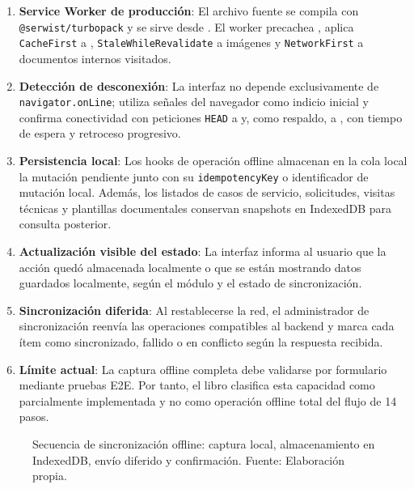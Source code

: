 \begin{enumerate}
    \item \textbf{Service Worker de producción}: El archivo fuente  se compila con \texttt{@serwist/turbopack} y se sirve desde . El worker precachea , aplica \texttt{CacheFirst} a , \texttt{StaleWhileRevalidate} a imágenes y \texttt{NetworkFirst} a documentos internos visitados.
    \item \textbf{Detección de desconexión}: La interfaz no depende exclusivamente de \texttt{navigator.onLine}; utiliza señales del navegador como indicio inicial y confirma conectividad con peticiones \texttt{HEAD} a  y, como respaldo, a , con tiempo de espera y retroceso progresivo.
    \item \textbf{Persistencia local}: Los hooks de operación offline almacenan en la cola local la mutación pendiente junto con su \texttt{idempotencyKey} o identificador de mutación local. Además, los listados de casos de servicio, solicitudes, visitas técnicas y plantillas documentales conservan snapshots en IndexedDB para consulta posterior.
    \item \textbf{Actualización visible del estado}: La interfaz informa al usuario que la acción quedó almacenada localmente o que se están mostrando datos guardados localmente, según el módulo y el estado de sincronización.
    \item \textbf{Sincronización diferida}: Al restablecerse la red, el administrador de sincronización reenvía las operaciones compatibles al backend y marca cada ítem como sincronizado, fallido o en conflicto según la respuesta recibida.
    \item \textbf{Límite actual}: La captura offline completa debe validarse por formulario mediante pruebas E2E. Por tanto, el libro clasifica esta capacidad como parcialmente implementada y no como operación offline total del flujo de 14 pasos.
\end{enumerate}

\begin{figure}[!htbp]
\centering
\resizebox{0.95\textwidth}{!}{%
%
}
\caption[Secuencia de sincronización offline]{Secuencia de sincronización offline: captura local, almacenamiento en IndexedDB, envío diferido y confirmación. Fuente: Elaboración propia.}
\label{fig:secuencia-offline-sync}
\end{figure}

